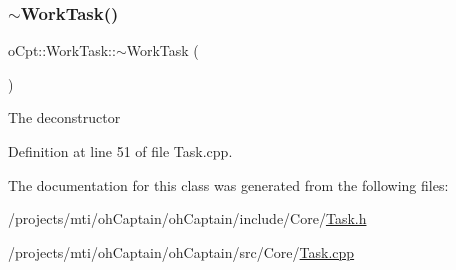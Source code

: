 \subsubsection{\texorpdfstring{$\sim$\+Work\+Task()}{~WorkTask()}}
{\footnotesize\ttfamily o\+Cpt\+::\+Work\+Task\+::$\sim$\+Work\+Task (\begin{DoxyParamCaption}{ }\end{DoxyParamCaption})\hspace{0.3cm}{\ttfamily [virtual]}}

The deconstructor 

Definition at line 51 of file Task.\+cpp.



The documentation for this class was generated from the following files\+:\begin{DoxyCompactItemize}
\item 
/projects/mti/oh\+Captain/oh\+Captain/include/\+Core/\hyperlink{_task_8h}{Task.\+h}\item 
/projects/mti/oh\+Captain/oh\+Captain/src/\+Core/\hyperlink{_task_8cpp}{Task.\+cpp}\end{DoxyCompactItemize}
